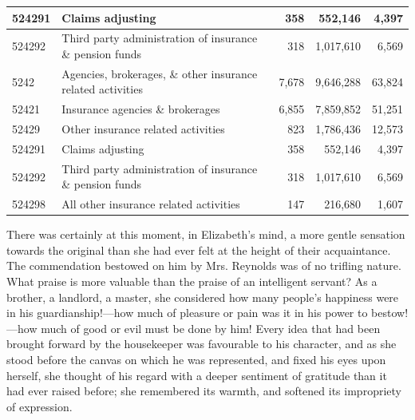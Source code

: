 \begin{landscape}
\begin{table}[!htb]
\begin{tabular}{|l|l|r|r|r|}
524291 & Claims   adjusting                                   & 358   & 552,146   & 4,397       \\ \hline
524292              & Third   party administration of insurance \& pension funds    & 318                     & 1,017,610                  & 6,569                   \\ \hline
5242                & Agencies,   brokerages, \& other insurance related activities & 7,678                   & 9,646,288                  & 63,824                  \\ \hline
52421  & Insurance   agencies \& brokerages                   & 6,855 & 7,859,852 & 51,251      \\ \hline
52429  & Other   insurance related activities                 & 823   & 1,786,436 & 12,573      \\ \hline
524291 & Claims   adjusting                                   & 358   & 552,146   & 4,397       \\ \hline
524292              & Third   party administration of insurance \& pension funds    & 318                     & 1,017,610                  & 6,569                   \\ \hline
524298 & All   other insurance related activities             & 147   & 216,680   & 1,607       \\ \hline

\end{tabular}
\end{table}
\vfill

\raisebox{0pt}{\makebox[\linewidth]{\thepage}}

\end{landscape}
\clearpage


There was certainly at this moment, in Elizabeth's mind, a more gentle sensation towards the original than she had ever felt at the height of their acquaintance. The commendation bestowed on him by Mrs. Reynolds was of no trifling nature. What praise is more valuable than the praise of an intelligent servant? As a brother, a landlord, a master, she considered how many people's happiness were in his guardianship!—how much of pleasure or pain was it in his power to bestow!—how much of good or evil must be done by him! Every idea that had been brought forward by the housekeeper was favourable to his character, and as she stood before the canvas on which he was represented, and fixed his eyes upon herself, she thought of his regard with a deeper sentiment of gratitude than it had ever raised before; she remembered its warmth, and softened its impropriety of expression.


